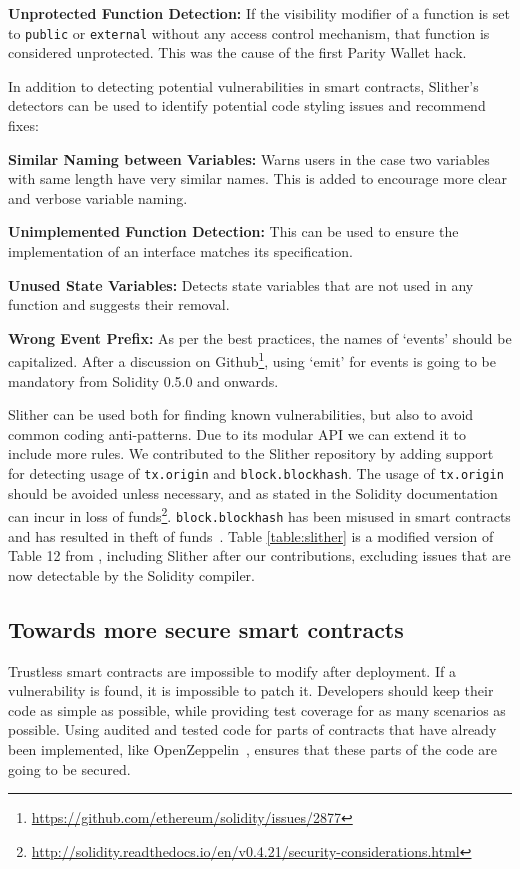 \textbf{Unprotected Function Detection:} If the visibility modifier of a function is set to \texttt{public} or \texttt{external} without any access control mechanism, that function is considered unprotected. This was the cause of the first Parity Wallet hack.

In addition to detecting potential vulnerabilities in smart contracts, Slither's detectors can be used to identify potential code styling issues and recommend fixes:

\textbf{Similar Naming between Variables:} Warns users in the case two variables with same length have very similar names. This is added to encourage more clear and verbose variable naming.

\textbf{Unimplemented Function Detection:} This can be used to ensure the implementation of an interface matches its specification.

\textbf{Unused State Variables:} Detects state variables that are not used in any function and suggests their removal.

\textbf{Wrong Event Prefix:} As per the best practices, the names of `events' should be capitalized. After a discussion on Github\footnote{\url{https://github.com/ethereum/solidity/issues/2877}}, using `emit' for events is going to be mandatory from Solidity 0.5.0 and onwards.

Slither can be used both for finding known vulnerabilities, but also to avoid common coding anti-patterns. Due to its modular API we can extend it to include more rules. We contributed to the Slither repository by adding support for detecting usage of \texttt{tx.origin} and \texttt{block.blockhash}. The usage of \texttt{tx.origin} should be avoided unless necessary, and as stated in the Solidity documentation can incur in loss of funds\footnote{\url{http://solidity.readthedocs.io/en/v0.4.21/security-considerations.html}}. \texttt{block.blockhash} has been misused in smart contracts and has resulted in theft of funds~\cite{smartbillions}. Table \ref{table:slither} is a modified version of Table 12 from \cite{tools}, including Slither after our contributions, excluding issues that are now detectable by the Solidity compiler.



\subsection{Towards more secure smart contracts}

Trustless smart contracts are impossible to modify after deployment. If a vulnerability is found, it is impossible to patch it. Developers should keep their code as simple as possible, while providing test coverage for as many scenarios as possible. Using audited and tested code for parts of contracts that have already been implemented, like OpenZeppelin~\cite{zeppelin-solidity}, ensures that these parts of the code are going to be secured. 

